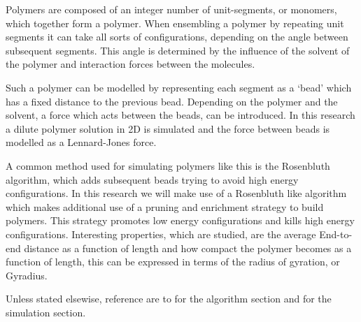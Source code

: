 Polymers are composed of an integer number of unit-segments, or monomers, which together form a polymer. When ensembling a polymer by repeating unit segments it can take all sorts of configurations, depending on the angle between subsequent segments. This angle is determined by the influence of the solvent of the polymer and interaction forces between the molecules. 

Such a polymer can be modelled by representing each segment as a `bead' which has a fixed distance to the previous bead. Depending on the polymer and the solvent, a force which acts between the beads, can be introduced. In this research a dilute polymer solution in 2D is simulated and the force between beads is modelled as a Lennard-Jones force.

A common method used for simulating polymers like this is the Rosenbluth algorithm, which adds subsequent beads trying to avoid high energy configurations. In this research we will make use of a Rosenbluth like algorithm which makes additional use of a pruning and enrichment strategy to build polymers. This strategy promotes low energy configurations and kills high energy configurations. 
Interesting properties, which are studied, are the average End-to-end distance as a function of length and how compact the polymer becomes as a function of length, this can be expressed in terms of the radius of gyration, or Gyradius.

Unless stated elsewise, reference are to \cite{baschnagel2004} for the algorithm section and \cite{thijssen2007} for the simulation section.